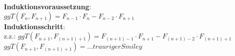 \documentclass[11pt,a4paper]{article}
\begin{document}
\textbf{Induktionsvoraussetzung}:\\
$ggT(F_n, F_{n+1}) = F_{n-1} \cdot F_n - F_{n-2}\cdot F_{n+1}$\\

\textbf{Induktionsschritt}:\\
z.z.: $ggT(F_{n+1}, F_{(n+1)+1})=F_{(n+1)-1} \cdot F_{n+1} - F_{(n+1)-2} \cdot F_{(n+1)+1}$\\
$ggT(F_{n+1}, F_{(n+1)+1})= ...trauriger Smiley$ \\


\end{document}
